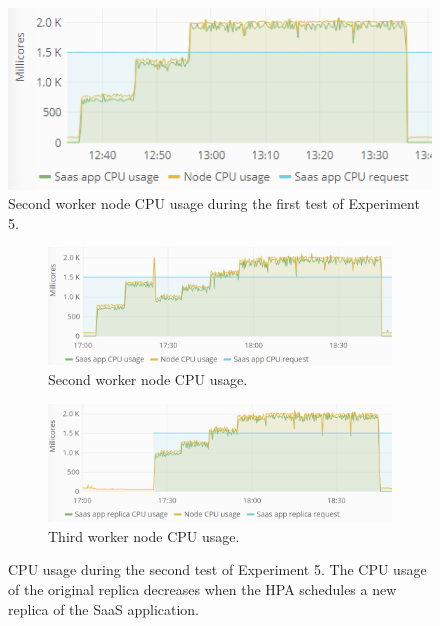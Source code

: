 \begin{figure}
\centering
\includegraphics[width=0.70\columnwidth]{Images/Experiments/CPU/Grafana/cpu-saas-li.PNG}
\caption{Second worker node CPU usage during the first test of Experiment 5.}
\label{fig:cpu-saas-li}
\end{figure}

%


\begin{figure}
\centering
\begin{subfigure}[b]{\columnwidth}
\centering
\includegraphics[width=0.70\columnwidth]{Images/Experiments/CPU/Grafana/cpu-saas-hpa-li-1.PNG}
\caption{Second worker node CPU usage.}
\label{fig:cpu-saas-hpa-li-1}
\end{subfigure}
\hfill
\begin{subfigure}[b]{\columnwidth}
\centering
\includegraphics[width=0.75\columnwidth]{Images/Experiments/CPU/Grafana/cpu-saas-hpa-li-2.PNG}
\caption{Third worker node CPU usage.}
\label{fig:cpu-saas-hpa-li-2}
\end{subfigure}
\hfill
\vspace*{-7mm}
\caption{CPU usage during the second test of Experiment 5. The CPU usage of the original replica decreases when the HPA schedules a new replica of the SaaS application.}
\label{fig:cpu-cas-hpa-li-2}
\end{figure}


